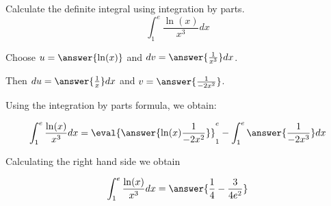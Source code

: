 \documentclass{ximera}
\author{Jason Miller}
\begin{document}
\begin{exercise}
Calculate the definite integral using integration by parts.
\[
\int_{1}^{e} \frac{ \ln(x)}{x^{3}} dx
\]


Choose $u=\answer{ \ln(x) }$ and $dv=\answer{\frac{1}{x^{3}}} dx$. 

Then $du= \answer{ \frac{1}{x} } dx$ and $v= \answer{\frac{1}{-2x^{2}}}$.

Using the integration by parts formula, we obtain:

\[
\int_{1}^{e} \frac{ \ln(x)}{x^{3}} dx= \eval{\answer{  \ln(x) \frac{1}{-2x^{2}}}}_1^e - \int_{1}^{e} \answer{ \frac{1}{-2x^{3}}}  dx
\]

Calculating the right hand side we obtain

\[
\int_{1}^{e} \frac{ \ln(x)}{x^{3}} dx= \answer{\frac{1}{4} - \frac{3}{4e^{2}} }
\]


\end{exercise}
\end{document}
